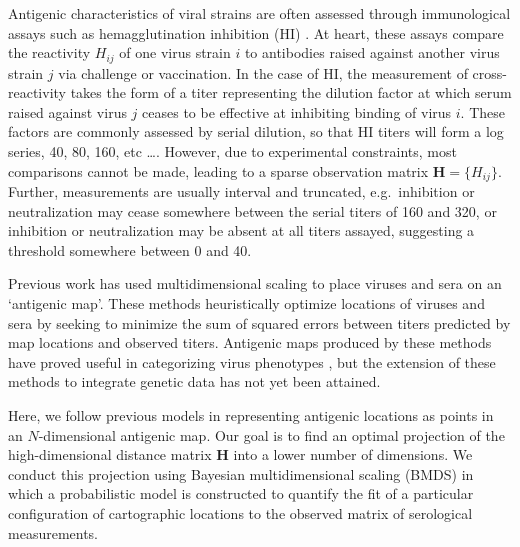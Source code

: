 \documentclass[11pt,oneside,letterpaper]{article}
\begin{document}
Antigenic characteristics of viral strains are often assessed through immunological assays such as hemagglutination inhibition (HI) \cite{Hirst43}.  
At heart, these assays compare the reactivity $H_{ij}$ of one virus strain $i$ to antibodies raised against another virus strain $j$ via challenge or vaccination.  
In the case of HI, the measurement of cross-reactivity takes the form of a titer representing the dilution factor at which serum raised against virus $j$ ceases to be effective at inhibiting binding of virus $i$.  
These factors are commonly assessed by serial dilution, so that HI titers will form a log series, 40, 80, 160, etc \dots.
However, due to experimental constraints, most comparisons cannot be made, leading to a sparse observation matrix $\mathbf{H} = \{H_{ij}\}$.  
Further, measurements are usually interval and truncated, e.g.\ inhibition or neutralization may cease somewhere between the serial titers of 160 and 320, or inhibition or neutralization may be absent at all titers assayed, suggesting a threshold somewhere between 0 and 40.  

Previous work \cite{Smith04, Cai10} has used multidimensional scaling to place viruses and sera on an `antigenic map'.  
These methods heuristically optimize locations of viruses and sera by seeking to minimize the sum of squared errors between titers predicted by map locations and observed titers.  
Antigenic maps produced by these methods have proved useful in categorizing virus phenotypes \cite{Smith04}, but the extension of these methods to integrate genetic data has not yet been attained.

Here, we follow previous models in representing antigenic locations as points in an $N$-dimensional antigenic map. 
Our goal is to find an optimal projection of the high-dimensional distance matrix $\mathbf{H}$ into a lower number of dimensions. 
We conduct this projection using Bayesian multidimensional scaling (BMDS) \cite{Oh01} in which a probabilistic model is constructed to quantify the fit of a particular configuration of cartographic locations to the observed matrix of serological measurements.
\end{document}
